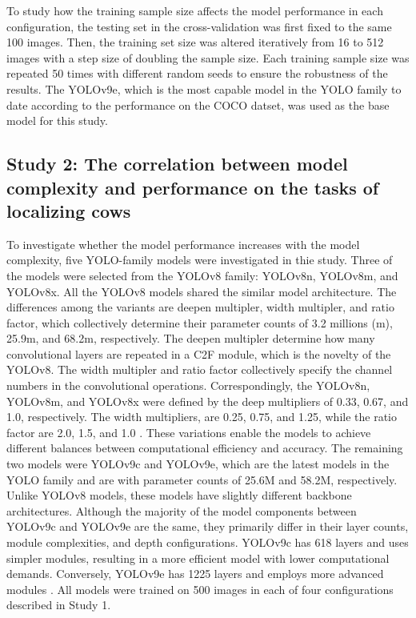 To study how the training sample size affects the model performance in each configuration, the testing set in the cross-validation was first fixed to the same 100 images. Then, the training set size was altered iteratively from 16 to 512 images with a step size of doubling the sample size. Each training sample size was repeated 50 times with different random seeds to ensure the robustness of the results. The YOLOv9e, which is the most capable model in the YOLO family to date according to the performance on the COCO datset, was used as the base model for this study.


\subsection*{Study 2: The correlation between model complexity and performance on the tasks of localizing cows}

To investigate whether the model performance increases with the model complexity, five YOLO-family models were investigated in thie study. Three of the models were selected from the YOLOv8 family: YOLOv8n, YOLOv8m, and YOLOv8x. All the YOLOv8 models shared the similar model architecture. The differences among the variants are deepen multipler, width multipler, and ratio factor, which collectively determine their parameter counts of 3.2 millions (m), 25.9m, and 68.2m, respectively. The deepen multipler determine how many convolutional layers are repeated in a C2F module, which is the novelty of the YOLOv8. The width multipler and ratio factor collectively specify the channel numbers in the convolutional operations. Correspondingly, the YOLOv8n, YOLOv8m, and YOLOv8x were defined by the deep multipliers of 0.33, 0.67, and 1.0, respectively. The width multipliers, are 0.25, 0.75, and 1.25, while the ratio factor are 2.0, 1.5, and 1.0 \citep{}. These variations enable the models to achieve different balances between computational efficiency and accuracy. The remaining two models were YOLOv9c and YOLOv9e, which are the latest models in the YOLO family and are with parameter counts of 25.6M and 58.2M, respectively.  Unlike YOLOv8 models, these models have slightly different backbone architectures. Although the majority of the model components between YOLOv9c and YOLOv9e are the same, they primarily differ in their layer counts, module complexities, and depth configurations. YOLOv9c has 618 layers and uses simpler modules, resulting in a more efficient model with lower computational demands. Conversely, YOLOv9e has 1225 layers and employs more advanced modules \citep{}. All models were trained on 500 images in each of four configurations described in Study 1.

